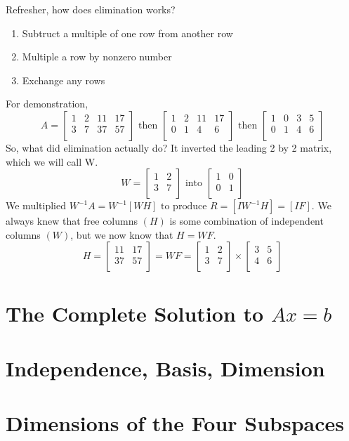 Refresher, how does elimination works?
\begin{enumerate}
    \item Subtruct a multiple of one row from another row
    \item Multiple a row by nonzero number
    \item Exchange any rows
\end{enumerate}
For demonstration,
\[
    A =
    \begin{bmatrix}
        1 & 2 & 11 & 17  \\
        3 & 7 & 37 & 57  \\
    \end{bmatrix}
    \text{ then }
    \begin{bmatrix}
        1 & 2 & 11 & 17  \\
        0 & 1 & 4 & 6  \\
    \end{bmatrix}
    \text{ then }
    \begin{bmatrix}
        1 & 0 & 3 & 5  \\
        0 & 1 & 4 & 6  \\
    \end{bmatrix}
\]
So, what did elimination actually do? It inverted the leading 2 by 2 matrix, which we will call W.
\[
    W =
    \begin{bmatrix}
        1 & 2  \\
        3 & 7  \\
    \end{bmatrix}
    \text{ into }
    \begin{bmatrix}
        1 & 0  \\
        0 & 1  \\
    \end{bmatrix}
\]
We multiplied \(W^{-1}A = W^{-1}[ W H ] \text{ to produce } R =  [I W^{-1} H ] = [ I F ]  \). We always knew that free columns \((H)\) is some combination of independent columns \((W)\), but we now know that \(H = W F\).
\[
    H =
    \begin{bmatrix}
        11 & 17 \\
        37 & 57  \\
    \end{bmatrix}
    = W F =
    \begin{bmatrix}
        1 & 2  \\
        3 & 7  \\
    \end{bmatrix}
    \times
    \begin{bmatrix}
        3 & 5  \\
        4 & 6  \\
    \end{bmatrix}
\]

\section{The Complete Solution to \(Ax = b\)}


\section{Independence, Basis, Dimension}

\section{Dimensions of the Four Subspaces}

